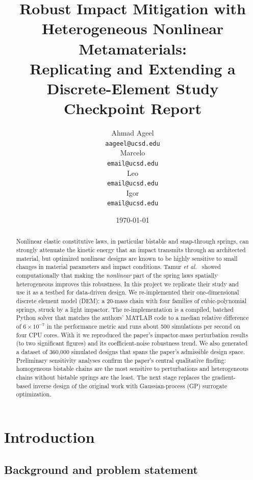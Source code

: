 \documentclass[12pt,letterpaper]{article}
\title{Robust Impact Mitigation with Heterogeneous Nonlinear Metamaterials:\\
       Replicating and Extending a Discrete-Element Study\\[4pt]
       \large Checkpoint Report}
\author{Ahmad Ageel \\
  {\tt aageel@ucsd.edu} \\\And
  Marcelo \\
  {\tt email@ucsd.edu} \\\And
  Leo \\
  {\tt email@ucsd.edu} \\\And
  Igor \\
  {\tt email@ucsd.edu} \\}
\date{\today}
\begin{document}
\maketitle

\begin{abstract}
Nonlinear elastic constitutive laws, in particular bistable and snap-through springs,
can strongly attenuate the kinetic energy that an impact transmits through an
architected material, but optimized nonlinear designs are known to be highly sensitive
to small changes in material parameters and impact conditions. Tamur
\emph{et al.}~\cite{tamur} showed computationally that making the \emph{nonlinear} part
of the spring laws spatially heterogeneous improves this robustness. In this project we
replicate their study and use it as a testbed for data-driven design. We
re-implemented their one-dimensional discrete element model (DEM): a 20-mass chain with
four families of cubic-polynomial springs, struck by a light impactor. The
re-implementation is a compiled, batched Python solver that matches the authors' MATLAB
code to a median relative difference of $6\times10^{-7}$ in the performance metric and
runs about 500 simulations per second on four CPU cores. With it we reproduced the
paper's impactor-mass perturbation results (to two significant figures) and its
coefficient-noise robustness trend. We also generated a dataset of 360{,}000 simulated
designs that spans the paper's admissible design space. Preliminary sensitivity
analyses confirm the paper's central qualitative finding: homogeneous bistable chains
are the most sensitive to perturbations and heterogeneous chains without bistable
springs are the least. The next stage replaces the gradient-based inverse design of the
original work with Gaussian-process (GP) surrogate optimization.
\end{abstract}

\section{Introduction}

\subsection{Background and problem statement}
\end{document}

